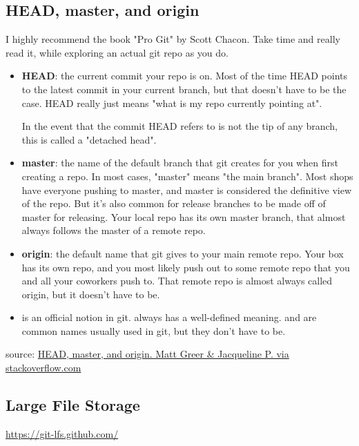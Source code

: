 \subsection{HEAD, master, and origin}

I highly recommend the book "Pro Git" by Scott Chacon. Take time and really read it, while exploring an actual git repo as you do.

\begin{itemize}
\item \textbf{HEAD}: the current commit your repo is on. Most of the time HEAD points to the latest commit in your current branch, but that doesn't have to be the case. HEAD really just means "what is my repo currently pointing at".

 In the event that the commit HEAD refers to is not the tip of any branch, this is called a "detached head".

\item
\textbf{master}: the name of the default branch that git creates for you when first creating a repo. In most cases, "master" means "the main branch". Most shops have everyone pushing to master, and master is considered the definitive view of the repo. But it's also common for release branches to be made off of master for releasing. Your local repo has its own master branch, that almost always follows the master of a remote repo.

\item
 \textbf{origin}: the default name that git gives to your main remote repo. Your box has its own repo, and you most likely push out to some remote repo that you and all your coworkers push to. That remote repo is almost always called origin, but it doesn't have to be.

\item
{} is an official notion in git.  always has a well-defined meaning.  and  are common names usually used in git, but they don't have to be.
\end{itemize}


source:  \href{https://stackoverflow.com/questions/8196544/what-are-the-git-concepts-of-head-master-origin}{HEAD, master, and origin. Matt Greer \& Jacqueline P. via stackoverflow.com}

\subsection{Large File Storage}

\url{https://git-lfs.github.com/}

